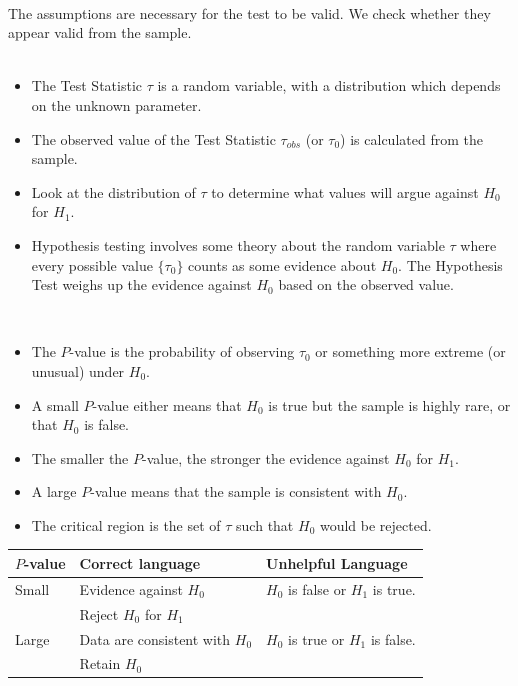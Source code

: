 \documentclass[t,xcolor=pdftex,dvipsnames,table]{beamer}\usepackage[]{graphicx}\usepackage[]{color}
\begin{document}
\begin{frame}[fragile]{}

 \\
The assumptions are necessary for the test to be valid. We check whether they appear valid from the sample. \\

\vspace{.5cm}
 \\
\begin{itemize}
\item The Test Statistic $\tau$ is a random variable, with a distribution which depends on the unknown parameter.
\item The observed value of the Test Statistic $\tau_{obs}$ (or $\tau_{0}$) is calculated from the sample.
\item Look at the distribution of $\tau$ to determine what values will argue against $H_0$ for $H_1$.
\item Hypothesis testing involves some theory about the random variable $\tau$ where every possible value $\{ \tau_{0} \}$ counts as some evidence about $H_{0}$. The Hypothesis Test weighs up  the evidence against $H_{0}$ based on the observed value.
\end{itemize}
\end{frame}

\begin{frame}[fragile]{}

 \\
\begin{itemize}
\item The $P$-value is the probability of observing $\tau_{0}$ or something more extreme (or unusual) under $H_{0}$. 

\item A small $P$-value either means that $H_{0}$ is true but the sample is highly rare, or that $H_{0}$ is false.

\item  The smaller the $P$-value, the stronger the evidence against $H_{0}$ for $H_{1}$.  

\item A large $P$-value means that the sample is consistent with $H_{0}$.

\item The critical region is the set of $\tau$ such that $H_{0}$ would be rejected.
\end{itemize}

\begin{tabular}{|l|l|l|} \hline
$P$-value & Correct language & Unhelpful Language \\ \hline
Small & Evidence against $H_{0}$ & $H_{0}$ is false or $H_{1}$ is true. \\
& Reject $H_{0}$  for $H_{1}$ & \\ \hline
Large & Data are consistent with $H_{0}$   & $H_{0}$ is true or $H_{1}$ is false. \\
& Retain $H_{0}$ & \\ \hline
\end{tabular}

\end{frame}
\end{document}
